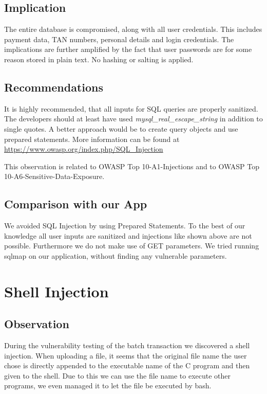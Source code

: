 \subsection{Implication}
The entire database is compromised, along with all user credentials. This includes payment data, TAN numbers, personal details and login credentials. The implications are further amplified by the fact that user passwords are for some reason stored in plain text. No hashing or salting is applied.

\subsection{Recommendations}
It is highly recommended, that all inputs for SQL queries are properly sanitized. The developers should at least have used \emph{mysql\_real\_escape\_string} in addition to single quotes. A better approach would be to create query objects and use prepared statements.
More information can be found at \url{https://www.owasp.org/index.php/SQL\_Injection}

This observation is related to OWASP Top 10-A1-Injections and to OWASP Top 10-A6-Sensitive-Data-Exposure.

\subsection{Comparison with our App}
We avoided SQL Injection by using Prepared Statements. To the best of our knowledge all user inputs are sanitized and injections like shown above are not possible. Furthermore we do not make use of GET parameters. We tried running sqlmap on our application, without finding any vulnerable parameters.

\section{Shell Injection}
\label{chapter:shell_injection}

\subsection{Observation}

During the vulnerability testing of the batch transaction we discovered a shell injection. When uploading a file, it seems that the original file name the user chose is directly appended to the executable name of the C program and then given to the shell. Due to this we can use the file name to execute other programs, we even managed it to let the file be executed by bash.\newline


